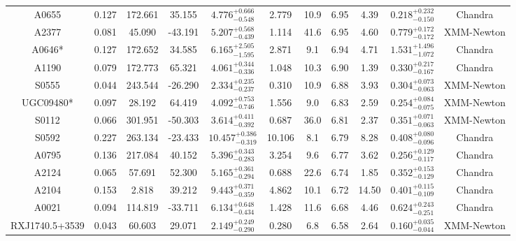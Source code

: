 \documentclass{aa}   %
\begin{document}
\begin{table}[h!]
\begin{center}
\begin{tabular}{ c  c  c  c c c c c c c c }
A0655               		&		0.127	&	172.661	&	35.155	& $	4.776^{+0.666}_{-0.548}$  &      2.779	&  10.9	&	6.95	&	4.39	&	$ 0.218^{+0.232}_{-0.150}  $ &	  Chandra     \\
A2377               		&		0.081	&	45.090	&	-43.191	& $	5.207^{+0.568}_{-0.439}$  &      1.114	&  41.6	&	6.95	&	4.60	&	$ 0.779^{+0.172}_{-0.172}  $ &	  XMM-Newton  \\
A0646*              		&		0.127	&	172.652	&	34.585	& $	6.165^{+2.505}_{-1.595}$  &      2.871	&  9.1	&	6.94	&	4.71	&	$ 1.531^{+1.496}_{-1.072}  $ &	  Chandra     \\
A1190               		&		0.079	&	172.773	&	65.321	& $	4.061^{+0.344}_{-0.336}$  &      1.048	&  10.3	&	6.90	&	1.39	&	$ 0.330^{+0.217}_{-0.167}  $ &	  Chandra     \\
S0555               		&		0.044	&	243.544	&	-26.290	& $	2.334^{+0.235}_{-0.237}$  &      0.310	&  10.9	&	6.88	&	3.93	&	$ 0.304^{+0.073}_{-0.063}  $ &	  XMM-Newton  \\
UGC09480*           		&		0.097	&	28.192	&	64.419	& $	4.092^{+0.753}_{-0.746}$  &      1.556	&  9.0	&	6.83	&	2.59	&	$ 0.254^{+0.084}_{-0.075}  $ &	  XMM-Newton  \\
S0112               		&		0.066	&	301.951	&	-50.303	& $	3.614^{+0.411}_{-0.392}$  &      0.687	&  36.0	&	6.81	&	2.37	&	$ 0.351^{+0.071}_{-0.063}  $ &	  XMM-Newton  \\
S0592               		&		0.227	&	263.134	&	-23.433	& $ 10.457^{+0.386}_{-0.319}$ &     10.106	&  8.1	&	6.79	&	8.28	&	$ 0.408^{+0.080}_{-0.096}  $ &	 Chandra      \\
A0795               		&		0.136	&	217.084	&	40.152	& $	5.396^{+0.343}_{-0.283}$  &      3.254	&  9.6	&	6.77	&	3.62	&	$ 0.256^{+0.129}_{-0.117}  $ &	  Chandra     \\
A2124               		&		0.065	&	57.691	&	52.300	& $	5.165^{+0.361}_{-0.294}$  &      0.688	&  22.6	&	6.74	&	1.85	&	$ 0.352^{+0.153}_{-0.129}  $ &	  Chandra     \\
A2104               		&		0.153	&	2.818	&	39.212	& $	9.443^{+0.371}_{-0.359}$  &      4.862	&  10.1	&	6.72	&	14.50	&	$ 0.401^{+0.115}_{-0.109}  $ &	 Chandra      \\
A0021               		&		0.094	&	114.819	&	-33.711	& $	6.134^{+0.648}_{-0.434}$  &      1.428	&  11.6	&	6.68	&	4.46	&	$ 0.624^{+0.243}_{-0.251}  $ &	  Chandra     \\
RXJ1740.5+3539      		&		0.043	&	60.603	&	29.071	& $	2.149^{+0.249}_{-0.290}$  &      0.280	&  6.8	&	6.58	&	2.64	&	$ 0.160^{+0.035}_{-0.044}  $ &	  XMM-Newton  \\

\end{tabular}
\end{center}
\end{table}
\end{document}
